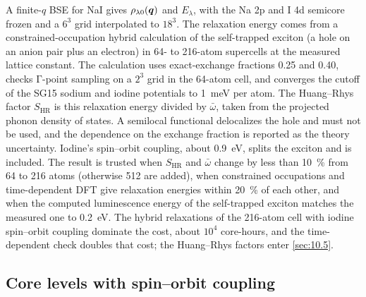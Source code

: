 A finite-$q$ BSE for NaI gives $\rho_{\lambda0}(\bm{q})$ and $E_\lambda$, with the Na 2p and I 4d semicore frozen and a $6^3$ grid interpolated to $18^3$. The relaxation energy comes from a constrained-occupation hybrid calculation of the self-trapped exciton (a hole on an anion pair plus an electron) in 64- to 216-atom supercells at the measured lattice constant. The calculation uses exact-exchange fractions 0.25 and 0.40, checks $\mathrm{\Gamma}$-point sampling on a $2^3$ grid in the 64-atom cell, and converges the cutoff of the SG15 sodium and iodine potentials to \SI{1}{meV} per atom. The Huang--Rhys factor $S_{\mathrm{HR}}$ is this relaxation energy divided by $\bar\omega$, taken from the projected phonon density of states. A semilocal functional delocalizes the hole and must not be used, and the dependence on the exchange fraction is reported as the theory uncertainty. Iodine's spin--orbit coupling, about \SI{0.9}{eV}, splits the exciton and is included. The result is trusted when $S_{\mathrm{HR}}$ and $\bar\omega$ change by less than \SI{10}{\percent} from 64 to 216 atoms (otherwise 512 are added), when constrained occupations and time-dependent DFT give relaxation energies within \SI{20}{\percent} of each other, and when the computed luminescence energy of the self-trapped exciton matches the measured one to \SI{0.2}{eV}. The hybrid relaxations of the 216-atom cell with iodine spin--orbit coupling dominate the cost, about $10^4$ core-hours, and the time-dependent check doubles that cost; the Huang--Rhys factors enter \cref{sec:10.5}.

\subsection{Core levels with spin--orbit coupling}

